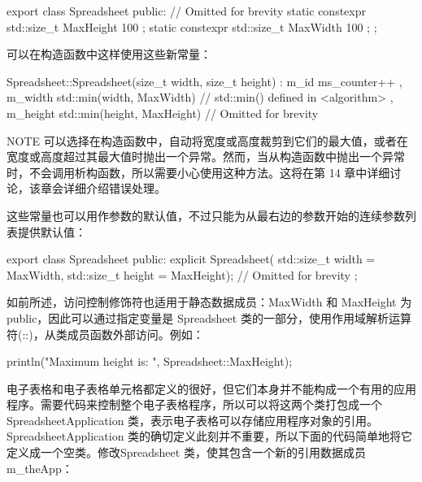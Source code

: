 \begin{cpp}
export class Spreadsheet
{
    public:
        // Omitted for brevity
        static constexpr std::size_t MaxHeight { 100 };
        static constexpr std::size_t MaxWidth { 100 };
};
\end{cpp}

可以在构造函数中这样使用这些新常量：

\begin{cpp}
Spreadsheet::Spreadsheet(size_t width, size_t height)
    : m_id { ms_counter++ }
    , m_width { std::min(width, MaxWidth) } // std::min() defined in <algorithm>
    , m_height { std::min(height, MaxHeight) }
{
    // Omitted for brevity
}
\end{cpp}

\begin{myNotic}{NOTE}
可以选择在构造函数中，自动将宽度或高度裁剪到它们的最大值，或者在宽度或高度超过其最大值时抛出一个异常。然而，当从构造函数中抛出一个异常时，不会调用析构函数，所以需要小心使用这种方法。这将在第 14 章中详细讨论，该章会详细介绍错误处理。
\end{myNotic}

这些常量也可以用作参数的默认值，不过只能为从最右边的参数开始的连续参数列表提供默认值：

\begin{cpp}
export class Spreadsheet
{
    public:
        explicit Spreadsheet(
            std::size_t width = MaxWidth, std::size_t height = MaxHeight);
        // Omitted for brevity
};
\end{cpp}


如前所述，访问控制修饰符也适用于静态数据成员：MaxWidth 和 MaxHeight 为public，因此可以通过指定变量是 Spreadsheet 类的一部分，使用作用域解析运算符(::)，从类成员函数外部访问。例如：

\begin{cpp}
println("Maximum height is: {}", Spreadsheet::MaxHeight);
\end{cpp}


电子表格和电子表格单元格都定义的很好，但它们本身并不能构成一个有用的应用程序。需要代码来控制整个电子表格程序，所以可以将这两个类打包成一个 SpreadsheetApplication 类，表示电子表格可以存储应用程序对象的引用。SpreadsheetApplication 类的确切定义此刻并不重要，所以下面的代码简单地将它定义成一个空类。修改Spreadsheet 类，使其包含一个新的引用数据成员 m\_theApp：

